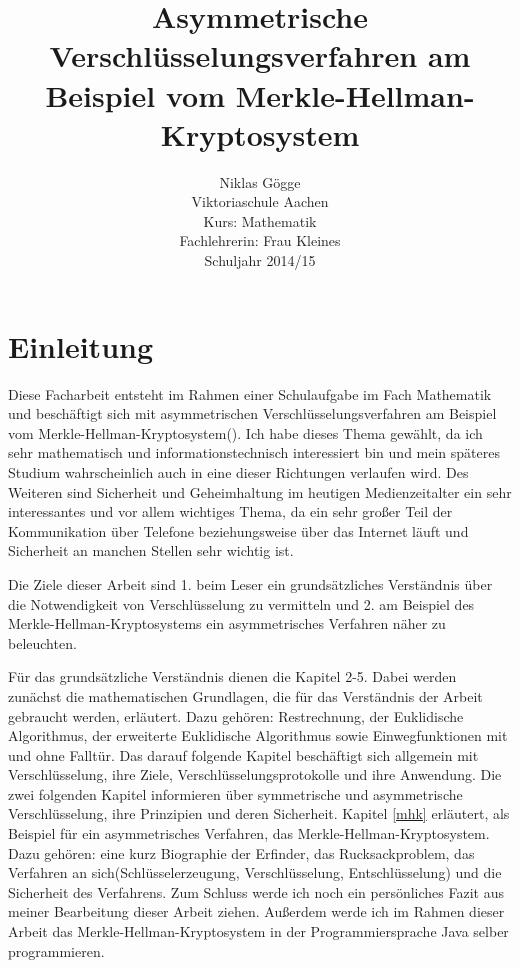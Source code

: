 \documentclass[a4paper,12pt,titlepage]{article}
\author
{
Niklas Gögge\\
Viktoriaschule Aachen\\
Kurs: Mathematik\\
Fachlehrerin: Frau Kleines\\
Schuljahr 2014/15
}
\begin{document}
\title{Asymmetrische Verschlüsselungsverfahren am Beispiel vom Merkle-Hellman-Kryptosystem}
\maketitle

\newpage
\tableofcontents
\newpage

\section{Einleitung}
Diese Facharbeit entsteht im Rahmen einer Schulaufgabe im Fach Mathematik und
beschäftigt sich mit asymmetrischen Verschlüsselungsverfahren am Beispiel vom
Merkle-Hellman-Kryptosystem(\cite{merklehellman_neer}). Ich habe dieses Thema gewählt, da ich sehr mathematisch und informationstechnisch interessiert bin und mein späteres
Studium wahrscheinlich auch in eine dieser Richtungen verlaufen wird. Des
Weiteren sind Sicherheit und Geheimhaltung im heutigen Medienzeitalter ein sehr
interessantes und vor allem wichtiges Thema, da ein sehr großer Teil der
Kommunikation über Telefone beziehungsweise über das Internet läuft und
Sicherheit an manchen Stellen sehr wichtig ist.

Die Ziele dieser Arbeit sind 1. beim Leser ein grundsätzliches Verständnis über die Notwendigkeit von Verschlüsselung zu vermitteln und 2. am Beispiel des Merkle-Hellman-Kryptosystems ein asymmetrisches Verfahren näher zu beleuchten.

Für das grundsätzliche Verständnis dienen die Kapitel 2-5. Dabei werden zunächst die mathematischen Grundlagen, die für das Verständnis der Arbeit gebraucht werden, erläutert. Dazu gehören: Restrechnung, der Euklidische Algorithmus, der erweiterte Euklidische Algorithmus sowie Einwegfunktionen mit und ohne Falltür. Das darauf folgende Kapitel beschäftigt sich allgemein mit Verschlüsselung, ihre Ziele, Verschlüsselungsprotokolle und ihre Anwendung. Die zwei folgenden Kapitel informieren über symmetrische und asymmetrische Verschlüsselung, ihre Prinzipien und deren Sicherheit. Kapitel \ref{mhk} erläutert, als Beispiel für ein asymmetrisches Verfahren, das Merkle-Hellman-Kryptosystem. Dazu gehören: eine kurz Biographie der Erfinder, das Rucksackproblem, das Verfahren an sich(Schlüsselerzeugung, Verschlüsselung, Entschlüsselung) und die Sicherheit des Verfahrens. Zum Schluss werde ich noch ein persönliches Fazit aus meiner
Bearbeitung dieser Arbeit ziehen. Außerdem werde ich im Rahmen dieser Arbeit
das Merkle-Hellman-Kryptosystem in der Programmiersprache Java selber
programmieren.  \newpage
\end{document}
